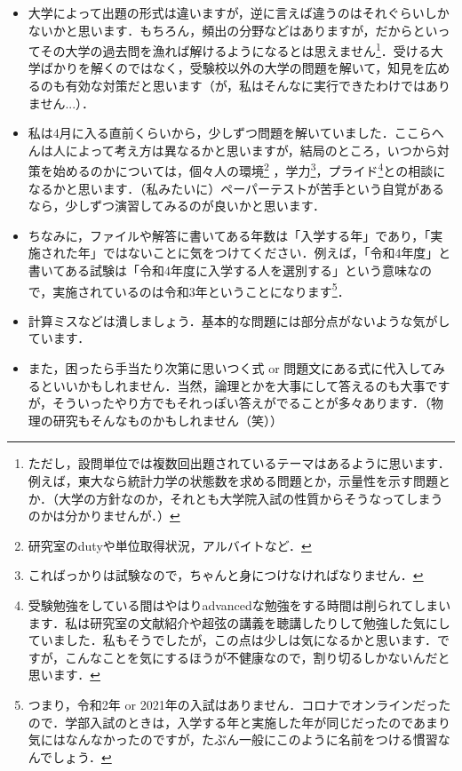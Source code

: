 \documentclass[a4paper,pdflatex,ja=standard]{bxjsarticle}
\begin{document}
\begin{itemize}
  \item 
  大学によって出題の形式は違いますが，逆に言えば違うのはそれぐらいしかないかと思います．もちろん，頻出の分野などはありますが，だからといってその大学の過去問を漁れば解けるようになるとは思えません\footnote{
    ただし，設問単位では複数回出題されているテーマはあるように思います．例えば，東大なら統計力学の状態数を求める問題とか，示量性を示す問題とか．（大学の方針なのか，それとも大学院入試の性質からそうなってしまうのかは分かりませんが．）
  }．受ける大学ばかりを解くのではなく，受験校以外の大学の問題を解いて，知見を広めるのも有効な対策だと思います（が，私はそんなに実行できたわけではありません...）．

  \item 
  私は4月に入る直前くらいから，少しずつ問題を解いていました．ここらへんは人によって考え方は異なるかと思いますが，結局のところ，いつから対策を始めるのかについては，個々人の環境\footnote{
    研究室のdutyや単位取得状況，アルバイトなど．
  }
  ，学力\footnote{
    こればっかりは試験なので，ちゃんと身につけなければなりません．
  }，プライド\footnote{
    受験勉強をしている間はやはりadvancedな勉強をする時間は削られてしまいます．私は研究室の文献紹介や超弦の講義を聴講したりして勉強した気にしていました．私もそうでしたが，この点は少しは気になるかと思います．ですが，こんなことを気にするほうが不健康なので，割り切るしかないんだと思います．
  }との相談になるかと思います．（私みたいに）ペーパーテストが苦手という自覚があるなら，少しずつ演習してみるのが良いかと思います．

  \item 
  ちなみに，ファイルや解答に書いてある年数は「入学する年」であり，「実施された年」ではないことに気をつけてください．例えば，「令和4年度」と書いてある試験は「令和4年度に入学する人を選別する」という意味なので，実施されているのは令和3年ということになります\footnote{
    つまり，令和2年 or 2021年の入試はありません．コロナでオンラインだったので．学部入試のときは，入学する年と実施した年が同じだったのであまり気にはなんなかったのですが，たぶん一般にこのように名前をつける慣習なんでしょう．
  }．

  \item
  計算ミスなどは潰しましょう．基本的な問題には部分点がないような気がしています．
  
  \item 
  また，困ったら手当たり次第に思いつく式 or 問題文にある式に代入してみるといいかもしれません．当然，論理とかを大事にして答えるのも大事ですが，そういったやり方でもそれっぽい答えがでることが多々あります．（物理の研究もそんなものかもしれません（笑））


\end{itemize}
\end{document}
